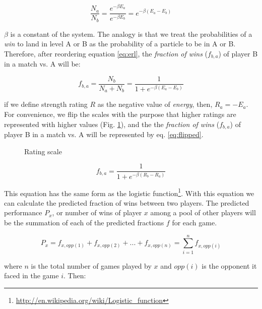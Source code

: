 \documentclass[12pt]{article}
\begin{document}
	\begin{equation} \label{eq:erl}
	\frac{N_{a}}{N_{b}} = \frac{ e^{-\beta E_{a}} }{ e^{-\beta E_{b}} } = e^{-\beta(E_{a}-E_{b})}
	\end{equation}

$\beta$ is a constant of the system.
The analogy is that we treat the probabilities of a \textit{win} to land in level A or B as the probability of a particle to be in A or B.
Therefore, after reordering equation \ref{eq:erl}, the \textit{fraction of wins} ($f_{b,a}$) of player B in a match vs. A will be:

	\begin{equation}
	f_{b,a}  = \frac{ N_{b} }{ N_{a}+N_{b} }  =     \frac{1}{1 + e^{-\beta(E_{a}-E_{b})}}  
	\end{equation}

if we define strength rating $R$ as the negative value of \textit{energy}, then, $R_{a} = -E_{a}$.
For convenience, we flip the scales with the purpose that higher ratings are represented with higher values (Fig. \ref{fig:figlevels2}), and the the \textit{fraction of wins} ($f_{b,a}$) of player B in a match vs. A will be represented by eq. \ref{eq:flipped}.

	\begin{figure}[htb]
	\caption{\label{fig:figlevels2} Rating scale}
	\end{figure}


	\begin{equation} \label{eq:flipped}
	f_{b,a}  = \frac{1}{1 + e^{-\beta(R_{b}-R_{a})}}
	\end{equation}

This equation has the same form as the logistic function\footnote{\url{http://en.wikipedia.org/wiki/Logistic_function}}.
With this equation we can calculate the predicted fraction of wins between two players. 
The predicted performance $P_{x}$, or number of wins of player $x$ among a pool of other players will be the summation of each of the predicted fractions $f$ for each game.

	\begin{equation}
	P_{x} = f_{x,opp(1)} + f_{x,opp(2)} + ... + f_{x,opp(n)} = \sum\limits_{i=1}^n f_{x,opp(i)}
	\end{equation}

where $n$ is the total number of games played by $x$ and $opp(i)$ is the opponent it faced in the game $i$. Then:
\end{document}
